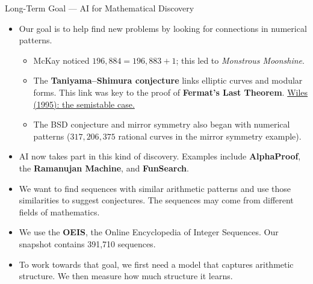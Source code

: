 \documentclass[aspectratio=169,10pt]{beamer}
\newcommand{\tightlist}{\setlength{\itemsep}{0.2em}}
\newcommand{\readout}[1]{\textcolor{readoutblue}{{\mdseries #1}}}
\begin{document}
\begin{frame}{Long-Term Goal --- AI for Mathematical Discovery}
\small
  \begin{itemize}\tightlist
    \item \readout{Our goal is to help find new problems by looking for connections in numerical patterns.}
      \begin{itemize}
        \item McKay noticed $196{,}884 = 196{,}883 + 1$; this led to \emph{Monstrous Moonshine}.
        \item \readout{The \textbf{Taniyama--Shimura conjecture} links elliptic curves and modular forms.
              This link was key to the proof of \textbf{Fermat's Last Theorem}.}
              {\footnotesize\href{https://annals.math.princeton.edu/1995/141-3/p01}{Wiles (1995): the semistable case.}}
        \item The BSD conjecture and mirror symmetry also began with numerical patterns
              ($317{,}206{,}375$ rational curves in the mirror symmetry example).
      \end{itemize}
    \item AI now takes part in this kind of discovery. Examples include
          \textbf{AlphaProof}, the \textbf{Ramanujan Machine}, and \textbf{FunSearch}.
    \item \readout{We want to find sequences with similar arithmetic patterns
          and use those similarities to suggest conjectures.}
          The sequences may come from different fields of mathematics.
    \item \readout{We use the \textbf{OEIS}, the Online Encyclopedia of Integer Sequences.}
          Our snapshot contains 391{,}710 sequences.
    \item \readout{To work towards that goal, we first need a model that captures arithmetic structure.}
          We then measure how much structure it learns.
  \end{itemize}
\end{frame}
\end{document}
